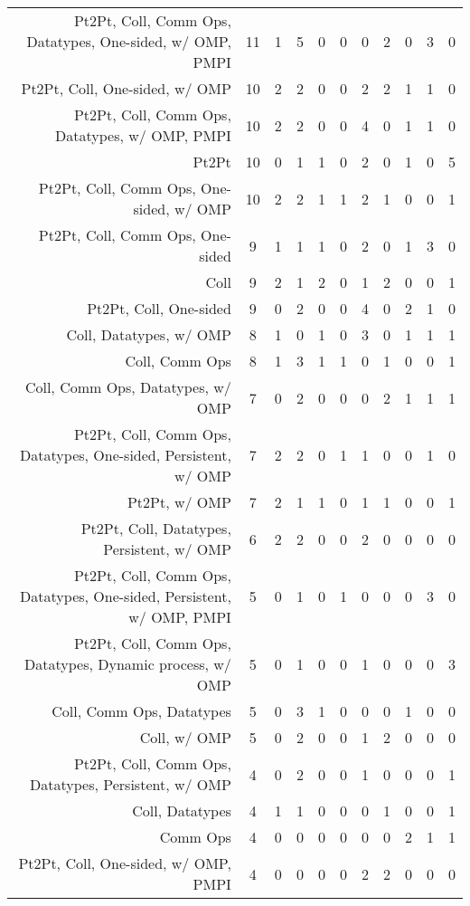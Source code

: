 {\begin{landscape}
\begin{longtable}[htb]{r|c|c|c|c|c|c|c|c|c|c}
{Pt2Pt, Coll, Comm Ops, Datatypes, One-sided, w/ OMP, PMPI} & 11 & 1 & 5 & 0 & 0 & 0 & 2 & 0 & 3 & 0 \\%
{Pt2Pt, Coll, One-sided, w/ OMP} & 10 & 2 & 2 & 0 & 0 & 2 & 2 & 1 & 1 & 0 \\%
{Pt2Pt, Coll, Comm Ops, Datatypes, w/ OMP, PMPI} & 10 & 2 & 2 & 0 & 0 & 4 & 0 & 1 & 1 & 0 \\%
{Pt2Pt} & 10 & 0 & 1 & 1 & 0 & 2 & 0 & 1 & 0 & 5 \\%
{Pt2Pt, Coll, Comm Ops, One-sided, w/ OMP} & 10 & 2 & 2 & 1 & 1 & 2 & 1 & 0 & 0 & 1 \\%
{Pt2Pt, Coll, Comm Ops, One-sided} & 9 & 1 & 1 & 1 & 0 & 2 & 0 & 1 & 3 & 0 \\%
{Coll} & 9 & 2 & 1 & 2 & 0 & 1 & 2 & 0 & 0 & 1 \\%
{Pt2Pt, Coll, One-sided} & 9 & 0 & 2 & 0 & 0 & 4 & 0 & 2 & 1 & 0 \\%
{Coll, Datatypes, w/ OMP} & 8 & 1 & 0 & 1 & 0 & 3 & 0 & 1 & 1 & 1 \\%
{Coll, Comm Ops} & 8 & 1 & 3 & 1 & 1 & 0 & 1 & 0 & 0 & 1 \\%
{Coll, Comm Ops, Datatypes, w/ OMP} & 7 & 0 & 2 & 0 & 0 & 0 & 2 & 1 & 1 & 1 \\%
{Pt2Pt, Coll, Comm Ops, Datatypes, One-sided, Persistent, w/ OMP} & 7 & 2 & 2 & 0 & 1 & 1 & 0 & 0 & 1 & 0 \\%
{Pt2Pt, w/ OMP} & 7 & 2 & 1 & 1 & 0 & 1 & 1 & 0 & 0 & 1 \\%
{Pt2Pt, Coll, Datatypes, Persistent, w/ OMP} & 6 & 2 & 2 & 0 & 0 & 2 & 0 & 0 & 0 & 0 \\%
{Pt2Pt, Coll, Comm Ops, Datatypes, One-sided, Persistent, w/ OMP, PMPI} & 5 & 0 & 1 & 0 & 1 & 0 & 0 & 0 & 3 & 0 \\%
{Pt2Pt, Coll, Comm Ops, Datatypes, Dynamic process, w/ OMP} & 5 & 0 & 1 & 0 & 0 & 1 & 0 & 0 & 0 & 3 \\%
{Coll, Comm Ops, Datatypes} & 5 & 0 & 3 & 1 & 0 & 0 & 0 & 1 & 0 & 0 \\%
{Coll, w/ OMP} & 5 & 0 & 2 & 0 & 0 & 1 & 2 & 0 & 0 & 0 \\%
{Pt2Pt, Coll, Comm Ops, Datatypes, Persistent, w/ OMP} & 4 & 0 & 2 & 0 & 0 & 1 & 0 & 0 & 0 & 1 \\%
{Coll, Datatypes} & 4 & 1 & 1 & 0 & 0 & 0 & 1 & 0 & 0 & 1 \\%
{Comm Ops} & 4 & 0 & 0 & 0 & 0 & 0 & 0 & 2 & 1 & 1 \\%
{Pt2Pt, Coll, One-sided, w/ OMP, PMPI} & 4 & 0 & 0 & 0 & 0 & 2 & 2 & 0 & 0 & 0 \\%

\end{longtable}
\end{landscape}}
